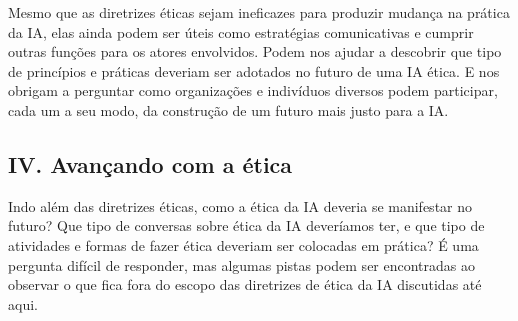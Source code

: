 \documentclass[
  11pt,
]{article}
\begin{document}
Mesmo que as diretrizes éticas sejam ineficazes para produzir mudança na
prática da IA, elas ainda podem ser úteis como estratégias comunicativas
e cumprir outras funções para os atores envolvidos. Podem nos ajudar a
descobrir que tipo de princípios e práticas deveriam ser adotados no
futuro de uma IA ética. E nos obrigam a perguntar como organizações e
indivíduos diversos podem participar, cada um a seu modo, da construção
de um futuro mais justo para a IA.

\subsection{IV. Avançando com a
ética}\label{iv.-avanuxe7ando-com-a-uxe9tica}

Indo além das diretrizes éticas, como a ética da IA deveria se
manifestar no futuro? Que tipo de conversas sobre ética da IA deveríamos
ter, e que tipo de atividades e formas de fazer ética deveriam ser
colocadas em prática? É uma pergunta difícil de responder, mas algumas
pistas podem ser encontradas ao observar o que fica fora do escopo das
diretrizes de ética da IA discutidas até aqui.
\end{document}
